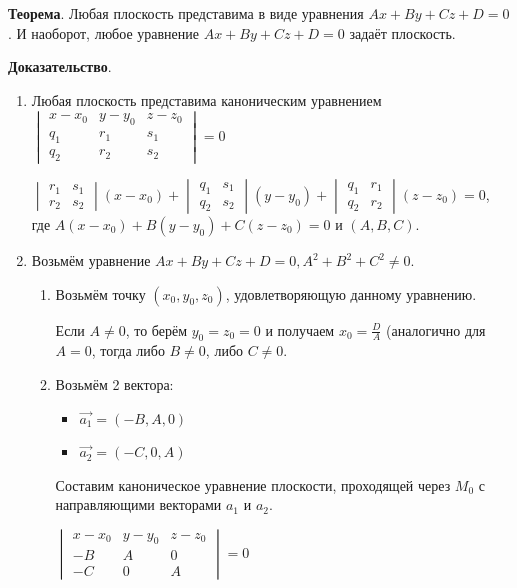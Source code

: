 \documentclass[a4paper]{article}
\begin{document}
{\begin{small}
\textbf{Теорема}. Любая плоскость представима в виде уравнения $Ax+By+Cz+D=0$. И наоборот, любое уравнение $Ax+By+Cz+D=0$ задаёт плоскость.

\textbf{Доказательство}. \begin{enumerate}
\item Любая плоскость представима каноническим уравнением $\begin{vmatrix}
	x-x_0& y-y_0& z-z_0\\
	q_1& r_1& s_1\\
	q_2& r_2& s_2
\end{vmatrix} = 0$\newline

$\begin{vmatrix}
	r_1& s_1\\
	r_2&s_2
\end{vmatrix}(x-x_0)+ \begin{vmatrix}
	q_1& s_1\\
	q_2&s_2
\end{vmatrix} (y-y_0)+ \begin{vmatrix}
	q_1& r_1\\
	q_2&r_2
\end{vmatrix} (z-z_0) = 0$, где $A(x-x_0)+B(y-y_0)+C(z-z_0) = 0$ и $(A,B,C)$.

\item Возьмём уравнение $Ax+By+Cz+D=0, A^2 + B^2 + C^2 \neq 0$.
\begin{enumerate}
\item Возьмём точку $(x_0, y_0, z_0)$, удовлетворяющую данному уравнению.

Если $A\neq 0$, то берём $y_0 = z_0 = 0$ и получаем $\displaystyle x_0 = \frac{D}{A}$ (аналогично для $A=0$, тогда либо $B \neq 0$, либо $C \neq 0$.

\item Возьмём 2 вектора: 

\begin{itemize}
\item $\vec{a_1} = (-B, A, 0)$
\item $\vec{a_2} = (-C, 0, A)$
\end{itemize}

Составим каноническое уравнение плоскости, проходящей через $M_0$ с направляющими векторами $a_1$ и $a_2$.

$\begin{vmatrix}
	x-x_0& y-y_0& z-z_0\\
	-B& A& 0\\
	-C& 0& A
\end{vmatrix} = 0$


\end{enumerate}
\end{enumerate}
\end{small}}
\end{document}
